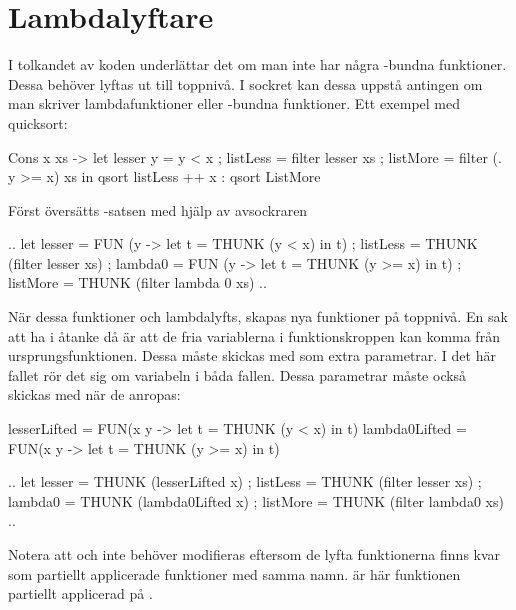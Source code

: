 \documentclass[../Core]{subfiles}
\begin{document}
\section{Lambdalyftare}
\label{sec:LamLift}

I tolkandet av koden underlättar det om man inte har några -bundna funktioner.
Dessa behöver lyftas ut till toppnivå. I sockret kan dessa uppstå antingen
om man skriver lambdafunktioner eller -bundna funktioner. Ett exempel
med quicksort:

\begin{codeEx}
  Cons x xs ->
      let { lesser y = y < x
          ; listLess = filter lesser xs
          ; listMore = filter (\y . y >= x) xs
          }
      in  qsort listLess ++ x : qsort ListMore
\end{codeEx}

Först översätts -satsen med hjälp av avsockraren

\begin{codeEx}
  .. let { lesser = FUN (y -> let t = THUNK (y < x) in t)
         ; listLess = THUNK (filter lesser xs)
         ; lambda0 = FUN (y -> let t = THUNK (y >= x) in t)
         ; listMore = THUNK (filter lambda 0 xs)
         } ..
\end{codeEx}
      
När dessa funktioner  och  lambdalyfts, skapas nya funktioner
på toppnivå. En sak att ha i åtanke då är att de fria variablerna i funktionskroppen 
kan komma från ursprungsfunktionen. Dessa måste skickas med
som extra parametrar. I det här fallet rör det sig om variabeln  i båda fallen.
Dessa parametrar måste också skickas med när de anropas:
\begin{codeEx}
lesserLifted  = FUN(x y -> let t = THUNK (y <  x) in t)
lambda0Lifted = FUN(x y -> let t = THUNK (y >= x) in t)

    .. let { lesser   = THUNK (lesserLifted   x)
           ; listLess = THUNK (filter lesser  xs)
           ; lambda0  = THUNK (lambda0Lifted  x)
           ; listMore = THUNK (filter lambda0 xs)
           } ..
\end{codeEx}

Notera att  och  
inte behöver modifieras eftersom de lyfta funktionerna finns kvar som partiellt applicerade funktioner 
med samma namn.  är här funktionen 
partiellt applicerad på .
\end{document}
